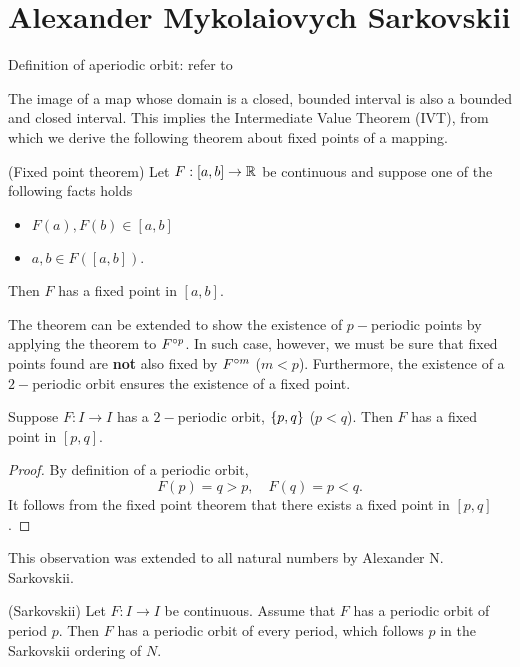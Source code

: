 \documentclass[12pt,twoside,draft]{book}
\begin{document}
\section{Alexander Mykolaiovych Sarkovskii}
Definition of aperiodic orbit: refer to%

The image of a map whose domain is a closed, bounded interval is also a bounded and closed interval.
This implies the Intermediate Value Theorem (IVT), from which we derive the following theorem about
fixed points of a mapping.
\begin{proposition}
  (Fixed point theorem)
  Let $F: [a,b] \to \mathbb{R}$ be continuous and suppose one of the following facts holds
  \begin{itemize}
    \item $F(a), F(b)\in [a,b]$
    \item $a, b\in F([a,b])$.
  \end{itemize}
  Then $F$ has a fixed point in $[a,b]$.
\end{proposition}

The theorem can be extended to show the existence of $p-$periodic points by applying the theorem to
$F^{\circ p}$. In such case, however, we must be sure that fixed points found are \textbf{not} also fixed by
$F^{\circ m}$ ($m < p$).
Furthermore, the existence of a $2-$periodic orbit ensures the existence of a fixed point.
\begin{proposition}
  Suppose $F: I\to I$ has a $2-$periodic orbit, $\left \{ p,q \right \}$ ($p<q$). Then $F$ has a fixed point in $[p,q]$.
\end{proposition}
\begin{proof}
  By definition of a periodic orbit, 
  \begin{equation*}
    F(p) = q > p, \quad F(q) = p < q.
  \end{equation*}
  It follows from the fixed point theorem that there exists a fixed point in $[p,q]$.
\end{proof}

This observation was extended to all natural numbers by Alexander N. Sarkovskii.
\begin{proposition}
  (Sarkovskii)
  Let $F: I\to I$ be continuous. Assume that $F$ has a periodic orbit of period $p$.
  Then $F$ has a periodic orbit of every period, which follows $p$ in the Sarkovskii
  ordering of $N$.
\end{proposition}
\end{document}
